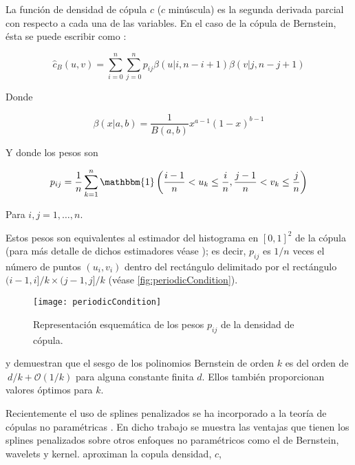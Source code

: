 La funci\'on de densidad de c\'opula $c$ ($c$ min\'uscula) es la segunda derivada parcial con respecto a cada una de las variables. En el caso de la c\'opula de Bernstein, \'esta se puede escribir como \citep{carnicero_non-parametric_2013}:

\begin{equation}
	\hat{c}_{B} (u,v)
	= \sum_{i = 0}^{n} {\sum_{j = 0}^{n} p_{i j}}
	\beta \left( u|i,n-i+1 \right)
	\beta \left( v|j,n-j+1 \right)
	\label{eq:bernsCopDens2D}
\end{equation}

Donde

\begin{equation*}
	\beta (x|a,b) = \frac{1}{B(a,b)} x^{a-1} (1-x)^{b-1}
\end{equation*}

\noindent
Y donde los pesos son

\begin{equation}
	p_{ij} = \frac{1}{n}\sum_{k=1}^{n}
	\mathbbm{1}
	\left(
	\frac{i-1}{n} < u_k \le \frac{i}{n},
	\frac{j-1}{n} < v_k \le \frac{j}{n}
	\right)
	\label{eq:copWeights}
\end{equation}

\noindent
Para $i,j = 1,\ldots,n$.

Estos pesos son equivalentes al estimador del histograma en $[0,1]^2$ de la c\'opula (para m\'as detalle de dichos estimadores v\'ease \cite{scott_multivariate_1992}); es decir, $p_{ij}$  es $1/n$ veces el n\'umero de puntos $(u_i, v_i)$ dentro del rect\'angulo delimitado por el rect\'angulo $(i-1,i]/k \times (j-1,j]/k$ (v\'ease \autoref{fig:periodicCondition}).

\begin{figure}[H]
	\centering
	\texttt{[image: periodicCondition]}
	\caption{Representaci\'on esquem\'atica de los pesos $p_{ij}$ de la densidad de c\'opula.}
	\label{fig:periodicCondition}
\end{figure}

\cite{sancetta_bernstein_2004} y \cite{phillips_interpolation_2003} demuestran que el sesgo de los polinomios Bernstein de orden \(k\) es del orden de\(\ d \slash k + \mathcal{O}(1 \slash k)\) para alguna constante finita \(d\). Ellos tambi\'en proporcionan valores \'optimos para \(k\).

Recientemente el uso de splines penalizados se ha incorporado a la teor\'ia de c\'opulas no param\'etricas \cite{kauermann_flexible_2013}. En dicho trabajo se muestra las ventajas que tienen los splines penalizados sobre otros enfoques no param\'etricos como el de Bernstein, wavelets y kernel. \cite{kauermann_flexible_2013} aproximan la copula densidad, \(c\),

